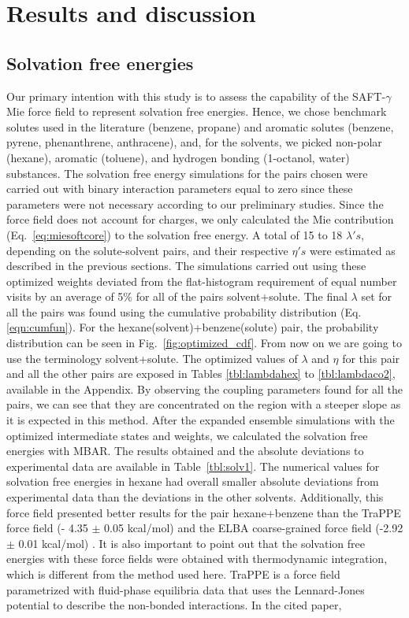 \documentclass[final,12p,times,twocolumn]{elsarticle}
\begin{document}
	\section{Results and discussion}

	\subsection{Solvation free energies}

	Our primary intention with this study is to assess the capability of the SAFT-$\gamma$ Mie force field to represent solvation free energies. Hence, we chose benchmark solutes used in the literature (benzene, propane) and aromatic solutes (benzene, pyrene, phenanthrene, anthracene), and, for the solvents, we picked non-polar (hexane), aromatic (toluene), and hydrogen bonding (1-octanol, water) substances. The solvation free energy simulations for the pairs chosen were carried out with binary interaction parameters equal to zero since these parameters were not necessary according to our preliminary studies. Since the force field does not account for charges, we only calculated the Mie contribution (Eq.~\eqref{eq:miesoftcore}) to the solvation free energy. A total of 15 to 18 $\lambda 's$, depending on the solute-solvent pairs, and their respective $\eta 's$ were estimated as described in the previous sections. The simulations carried out using these optimized weights deviated from the flat-histogram requirement of equal number visits by an average of 5\% for all of the pairs solvent+solute. The final $\lambda$ set for all the pairs was found using the cumulative probability distribution (Eq. \eqref{eqn:cumfun}). For the hexane(solvent)+benzene(solute) pair, the probability distribution  can be seen in Fig.~\ref{fig:optimized_cdf}. From now on we are going to use the terminology solvent+solute. The optimized values of $\lambda$ and $\eta$ for this pair and all the other pairs are exposed in Tables \ref{tbl:lambdahex} to \ref{tbl:lambdaco2}, available in the Appendix. By observing the coupling parameters found for all the pairs, we can see that they are concentrated on the region with a steeper slope as it is expected in this method. After the expanded ensemble simulations with the optimized intermediate states and weights, we calculated the solvation free energies with MBAR. The results obtained and the absolute deviations to experimental data \cite{doi:10.1021/ci034120c} are available  in Table~\ref{tbl:solv1}. The numerical values for solvation free energies in hexane had overall smaller absolute deviations from experimental data than the deviations in the other solvents. Additionally, this force field presented better results for the pair hexane+benzene than the TraPPE force field (- 4.35  $\pm$ 0.05 kcal/mol) \cite{garrido2011} and the ELBA coarse-grained force field  (-2.92 $\pm$ 0.01 kcal/mol) \cite{doi:10.1021/acs.jctc.5b00963}. It is also important to point out that the solvation free energies with these force fields were obtained with thermodynamic integration, which is different from the method used here. TraPPE is a force field parametrized with fluid-phase equilibria data that uses the Lennard-Jones potential to describe the non-bonded interactions. In the cited paper, 
\end{document}

